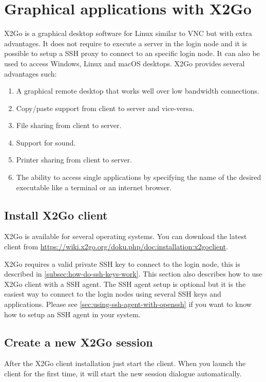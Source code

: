 \chapter{Graphical applications with X2Go}
\label{ch:x2go}

X2Go is a graphical desktop software for Linux similar to VNC but with extra advantages.
It does not require to execute a server in the login node and it is possible to setup a SSH proxy to
connect to an specific login node.
It can also be used to access Windows, Linux and macOS desktops.
X2Go provides several advantages such:
\begin{enumerate}
 \item A graphical remote desktop that works well over low bandwidth connections.
 \item Copy/paste support from client to server and vice-versa.
 \item File sharing from client to server.
 \item Support for sound.
 \item Printer sharing from client to server.
 \item The ability to access single applications by specifying the name of the desired executable like a terminal
 or an internet browser.
\end{enumerate}



\section{Install X2Go client}
\label{sec:x2go-client}
X2Go is available for several operating systems. You can download the latest client from 
\url{https://wiki.x2go.org/doku.php/doc:installation:x2goclient}.

X2Go requires a valid private SSH key to connect to the login node,
this is described in \autoref{subsec:how-do-ssh-keys-work}.
This section also describes how to use X2Go client with a SSH agent. The SSH agent setup is optional but it 
is the easiest way to connect to the login nodes using several SSH keys and applications.
Please see \autoref{sec:using-ssh-agent-with-openssh} if you want to know how to setup an SSH agent in your system.


\section{Create a new X2Go session}
\label{sec:sessions-x2go}

After the X2Go client installation just start the client.
When you launch the client for the first time, it will start the new session dialogue automatically.

